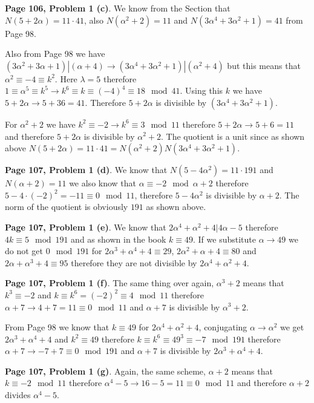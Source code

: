 \documentclass[aps,preprint,preprintnumbers,nofootinbib,showpacs,prd]{revtex4-1}
\begin{document}
{\bf Page 106, Problem 1 (c)}. We know from the Section that $N(5 + 2\alpha) = 11 \cdot 41$, also $N(\alpha^2 + 2) = 11$ and $N(3\alpha^4 + 3\alpha^2 + 1) = 41$ from Page 98. 

Also from Page 98 we have $(3\alpha^2 + 3\alpha + 1)|(\alpha + 4) \to (3\alpha^4 + 3\alpha^2 + 1)|(\alpha^2 + 4)$ but this means that $\alpha^2 \equiv -4 \equiv k^2$. Here $\lambda = 5$ therefore $1 \equiv \alpha^5 \equiv k^5 \to k^6 \equiv k \equiv (-4)^4 \equiv 18 \mod{41}$. Using this $k$ we have $5 + 2\alpha \to 5 + 36 = 41$. Therefore $5 + 2\alpha$ is divisible by $(3\alpha^4 + 3\alpha^2 + 1)$.

For $\alpha^2 + 2$ we have $k^2 \equiv -2 \to k^6 \equiv 3 \mod{11}$ therefore $5 + 2\alpha \to 5 + 6 = 11$ and therefore $5 + 2\alpha$ is divisible by $\alpha^2 + 2$. The quotient is a unit since as shown above $N(5 + 2\alpha) = 11 \cdot 41 = N(\alpha^2 + 2) N(3\alpha^4 + 3\alpha^2 + 1)$.

{\bf Page 107, Problem 1 (d)}. We know that $N(5 - 4\alpha^2) = 11 \cdot 191$ and $N(\alpha + 2) = 11$ we also know that $\alpha \equiv -2 \mod{\alpha + 2}$ therefore $5 - 4\cdot (-2)^2 = -11 \equiv 0 \mod{11}$, therefore $5 - 4\alpha^2$ is divisible by $\alpha + 2$. The norm of the quotient is obviously $191$ as shown above.

{\bf Page 107, Problem 1 (e)}. We know that $2\alpha^4 + \alpha^2 + 4 | 4\alpha - 5$ therefore $4k \equiv 5 \mod{191}$ and as shown in the book $k \equiv 49$. If we substitute $\alpha \to 49$ we do not get $0 \mod{191}$ for $2\alpha^3 + \alpha^4 + 4 \equiv 29$, $2\alpha^2 + \alpha + 4 \equiv 80$ and $2\alpha + \alpha^3 + 4 \equiv 95$ therefore they are not divisible by $2\alpha^4 + \alpha^2 + 4$.

{\bf Page 107, Problem 1 (f)}. The same thing over again, $\alpha^3 + 2$ means that $k^3 \equiv -2$ and $k \equiv k^6 = (-2)^2 \equiv 4 \mod{11}$ therefore $\alpha + 7 \to 4 + 7 = 11 \equiv 0 \mod{11}$ and $\alpha + 7$ is divisible by $\alpha^3 + 2$.

From Page 98 we know that $k \equiv 49$ for $2\alpha^4 + \alpha^2 + 4$, conjugating $\alpha \to \alpha^2$ we get $2\alpha^3 + \alpha^4 + 4$ and $k^2 \equiv 49$ therefore $k \equiv k^6 \equiv 49^3 \equiv -7 \mod{191}$ therefore $\alpha + 7 \to -7 + 7 \equiv 0 \mod{191}$ and $\alpha + 7$ is divisible by $2\alpha^3 + \alpha^4 + 4$.

{\bf Page 107, Problem 1 (g)}. Again, the same scheme, $\alpha + 2$ means that $k \equiv -2 \mod{11}$ therefore $\alpha^4 - 5 \to 16 - 5 = 11 \equiv 0 \mod{11}$ and therefore $\alpha + 2$ divides $\alpha^4 - 5$.
\end{document}

